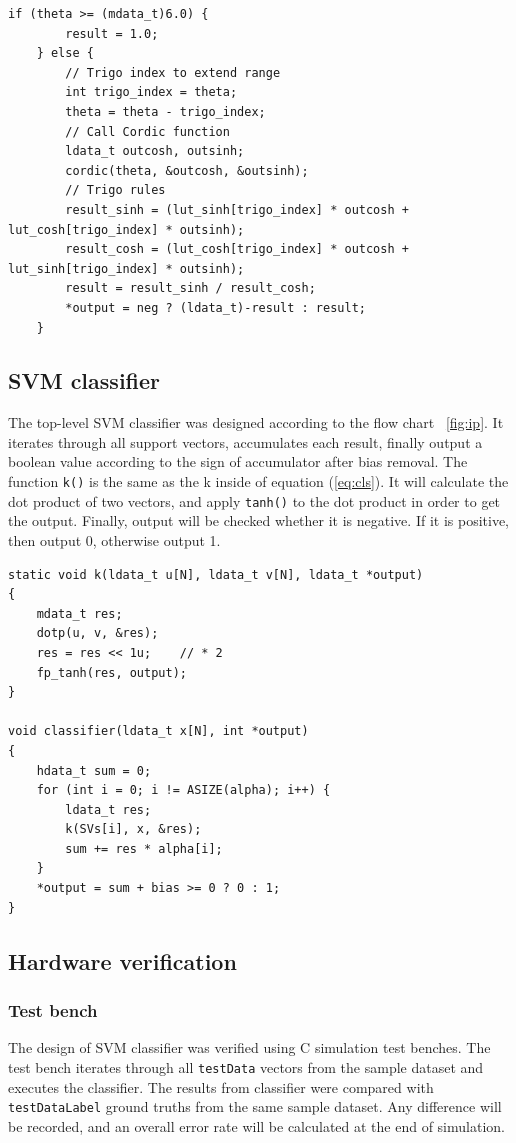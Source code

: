 \documentclass[journal]{IEEEtran}
\newcommand{\fref}[1]{\figurename~\ref{#1}}
\newcommand{\eref}[1]{(\ref{#1})}
\begin{document}
\begin{lstlisting}[caption={Extending the range of CORDIC},captionpos=b,label=lst:ext]
	if (theta >= (mdata_t)6.0) {
		result = 1.0;
	} else {
		// Trigo index to extend range
		int trigo_index = theta;
		theta = theta - trigo_index;
		// Call Cordic function
		ldata_t outcosh, outsinh;
		cordic(theta, &outcosh, &outsinh);
		// Trigo rules
		result_sinh = (lut_sinh[trigo_index] * outcosh + lut_cosh[trigo_index] * outsinh);
		result_cosh = (lut_cosh[trigo_index] * outcosh + lut_sinh[trigo_index] * outsinh);
		result = result_sinh / result_cosh;
		*output = neg ? (ldata_t)-result : result;
	}
\end{lstlisting}
\subsection{SVM classifier}

The top-level SVM classifier was designed according to the flow chart \fref{fig:ip}. It iterates through all support vectors, accumulates each result, finally output a boolean value according to the sign of accumulator after bias removal. The function \texttt{k()} is the same as the k inside of equation \eref{eq:cls}. It will calculate the dot product of two vectors, and apply \texttt{tanh()} to the dot product in order to get the output. Finally, output will be checked whether it is negative. If it is positive, then output 0, otherwise output 1.

\begin{lstlisting}[caption={Top-level SVM classifier},captionpos=b,label=lst:clas]
static void k(ldata_t u[N], ldata_t v[N], ldata_t *output)
{
	mdata_t res;
	dotp(u, v, &res);
	res = res << 1u;	// * 2
	fp_tanh(res, output);
}

void classifier(ldata_t x[N], int *output)
{
	hdata_t sum = 0;
	for (int i = 0; i != ASIZE(alpha); i++) {
		ldata_t res;
		k(SVs[i], x, &res);
		sum += res * alpha[i];
	}
	*output = sum + bias >= 0 ? 0 : 1;
}	
\end{lstlisting}

\subsection{Hardware verification}

\subsubsection{Test bench}

The design of SVM classifier was verified using C simulation test benches. The test bench iterates through all \texttt{testData} vectors from the sample dataset and executes the classifier. The results from classifier were compared with \texttt{testDataLabel} ground truths from the same sample dataset. Any difference will be recorded, and an overall error rate will be calculated at the end of simulation.
\end{document}
